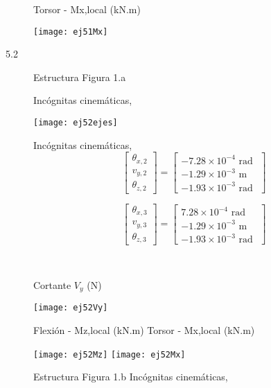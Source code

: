 \begin{description}
\begin{center}
Torsor - Mx,local (kN.m)

\texttt{[image: ej51Mx]}
\end{center}


\item[5.2]

Estructura Figura 1.a

Incógnitas cinemáticas,

\begin{center}
\texttt{[image: ej52ejes]}
\end{center}


\begin{minipage}{0.45\textwidth}
	Incógnitas cinemáticas,
$$
\left[
\begin{matrix}
\theta_{x,2} \\
v_{y,2} \\
\theta_{z,2}
\end{matrix}
\right]
=
\left[
\begin{matrix}
-7.28\times 10^{-4} \text{ rad }\\
-1.29\times 10^{-3} \text{ m }\\
-1.93\times 10^{-3} \text{ rad }
\end{matrix}
\right]
$$

$$
\left[
\begin{matrix}
\theta_{x,3} \\
v_{y,3} \\
\theta_{z,3}
\end{matrix}
\right]
=
\left[
\begin{matrix}
 7.28\times 10^{-4} \text{ rad }\\
-1.29\times 10^{-3} \text{ m }\\
-1.93\times 10^{-3} \text{ rad }
\end{matrix}
\right]
$$
\end{minipage}
~
\begin{minipage}{0.45\textwidth}
Cortante $V_y$ (N)

\texttt{[image: ej52Vy]}
\end{minipage}


Flexión - Mz,local (kN.m)   Torsor - Mx,local (kN.m)

\texttt{[image: ej52Mz]}
\texttt{[image: ej52Mx]}



Estructura Figura 1.b
Incógnitas cinemáticas,






\end{description}
